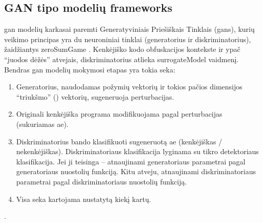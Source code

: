 \subsection{GAN tipo modelių \glspl{framework}}\label{sec:literature:gan}

\acs{gan} modelių karkasai paremti Generatyviniais Priešiškais Tinklais (\aclp{gan}), kurių veikimo principas yra du neuroniniai tinklai (generatorius ir diskriminatorius), žaidžiantys \gls{zeroSumGame} \cite{chenInfoGANInterpretableRepresentation2016a}. Kenkėjiško kodo obfuskacijos kontekste ir ypač \enquote{juodos dėžės} atvejais, diskriminatorius atlieka \gls{surrogateModel} vaidmenį. Bendras \ac{gan} modelių mokymosi etapas yra tokia seka:
\begin{enumerate}
    \item Generatorius, naudodamas požymių vektorių ir tokios pačios dimensijos
          \enquote{triukšmo} () vektorių, sugeneruoja perturbacijas.
    \item Originali kenkėjiška programa modifikuojama pagal perturbacijas (sukuriamas
          \ac{ae}).
    \item Diskriminatorius bando klasifikuoti sugeneruotą \ac{ae} (kenkėjiškas /
          nekenkėjiškas). Diskriminatoriaus klasifikacija lyginama su tikro detektoriaus
          klasifikacija. Jei ji teisinga -- atnaujinami generatoriaus parametrai pagal
          generatoriaus nuostolių funkciją. Kitu atveju, atnaujinami diskriminatoriaus
          parametrai pagal diskriminatoriaus nuostolių funkciją.
    \item Visa seka kartojama nustatytą kiekį kartų.
\end{enumerate} \cite{huGeneratingAdversarialMalware2017,zhuNgramMalGANEvading2022,zhongMalFoxCamouflagedAdversarial2024}.


